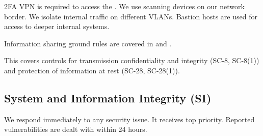 2FA VPN is required to access the \PZ.
We use scanning devices on our network border.
We isolate internal traffic on different VLANs.
Bastion hosts are used for access to deeper internal systems.

Information sharing ground rules are  covered in  and .

This covers  controls for transmission confidentiality and integrity (SC-8, SC-8(1)) and
protection of information at rest (SC-28, SC-28(1)).

\subsection{ System and Information Integrity (SI)} \label{sec:SI}
We respond immediately to any security issue.
It receives top priority.
Reported vulnerabilities are dealt with within 24 hours.

